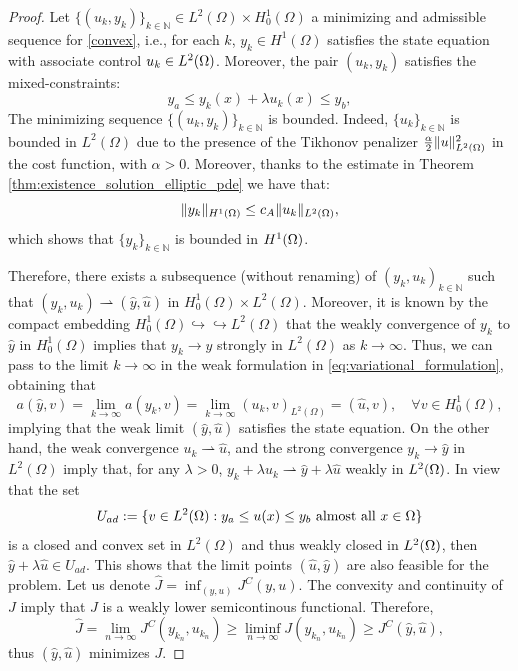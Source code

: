   \begin{proof}
   Let $\{(u_k,y_k)\}_{k\in \mathbb{N}}\in L^2(\Omega)\times H_0^1(\Omega)$ a minimizing and 
   admissible sequence for \eqref{convex}, i.e., for each $k$, $y_k \in H^1(\Omega)$ satisfies 
   the state equation with associate control $u_k \in L^2(\Omega)$. Moreover, the pair $(u_k,y_k)$ 
   satisfies the mixed-constraints:
    \[
    y_a\le y_k(x)+\lambda u_{k}(x)\le y_b,
    \]
	The minimizing sequence $\{(u_k,y_k)\}_{k\in \mathbb{N}}$ is bounded. Indeed, 
	$\{u_k\}_{k\in \mathbb{N}}$ is bounded in $L^2(\Omega)$  due to the presence of the 
	Tikhonov penalizer $\frac{\alpha}{2}\lVert u \rVert_{L^2(\Omega)}^2$ in the cost function, with 
	$\alpha>0$. Moreover, thanks to the estimate in Theorem \ref{thm:existence_solution_elliptic_pde} 
	we have that: 
	$$ 
	\lVert y_k \rVert_{H^1(\Omega)}\leq c_A \lVert u_k \rVert_{L^2(\Omega)},
	$$
	which shows that $\{y_k\}_{k\in \mathbb{N}}$ is bounded in $H^1(\Omega)$.

	Therefore, there exists  a subsequence (without renaming) of 
	$(y_k,u_k)_{k\in\mathbb{N}}$  such that 
	$(y_{k},u_{k})\rightharpoonup (\hat{y},\hat{u})$ in 
	$H_0^1(\Omega)\times L^2(\Omega)$. Moreover, it is known by the compact 
	embedding $H_0^1(\Omega) \hookrightarrow \hookrightarrow L^2(\Omega)$ that 
	the weakly convergence of $y_k$ to $\hat{y}$ in $H_0^1(\Omega)$ implies that 
	$y_{k}\to y$ strongly in $L^2(\Omega)$ as $k\to \infty$. Thus,  we can pass 
	to the limit $k\to \infty$ in the weak formulation in 
	\eqref{eq:variational_formulation}, obtaining that
	 \[
        a(\hat y, v)=\lim_{k\to\infty}a(y_k,v) = \lim_{k\to\infty}(u_k,v)_{L^2(\Omega)}=(\hat u,v),\quad \forall v \in H_0^1(\Omega),
    \]
	implying that the weak limit $(\hat y,\hat u)$ satisfies the state equation.
	On the other hand, the weak convergence  $u_k \rightharpoonup \hat u$, and
	the strong convergence $y_k \to \hat y$ in $L^2(\Omega)$ imply that, for 
	any $\lambda>0$, $y_k+\lambda u_k\rightharpoonup \hat{y}+\lambda\hat{u}$ 
	weakly in $L^2(\Omega)$. In view that the set 
	\[
		U_{ad}:=\{v\in L^2(\Omega ):y_a\le u(x)\le y_b \mbox{ almost all }x\in \Omega\}
	\]
	is a closed and convex set in $ L^2(\Omega)$ and thus weakly closed in 
	$L^2(\Omega)$, then $\hat{y}+\lambda\hat{u}\in U_{ad}$. This shows that the 
	limit points $(\hat{u},\hat{y})$ are also feasible for the problem.  
	Let us denote $\hat{J}=\inf_{(y,u)} J^{C}(y,u)$. The convexity and 
	continuity of $J$ imply that $J$ is a weakly lower semicontinous functional. 
	Therefore,
     \[
       \hat{J}=\lim_{n\to \infty}J^{C}(y_{k_n},u_{k_n})\ge \liminf_{n\to \infty}J(y_{k_n},u_{k_n})\ge J^{C}(\hat{y},\hat{u}),
    \]
       thus $(\hat{y},\hat{u})$ minimizes $J$.
   \end{proof}

